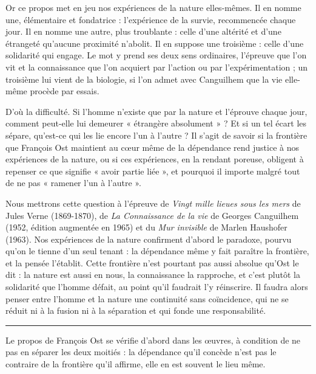 \documentclass[11pt,a4paper]{article}
\begin{document}
Or ce propos met en jeu nos expériences de la nature elles-mêmes. Il en nomme une, élémentaire et fondatrice : l'expérience de la survie, recommencée chaque jour. Il en nomme une autre, plus troublante : celle d'une altérité et d'une étrangeté qu'aucune proximité n'abolit. Il en suppose une troisième : celle d'une solidarité qui engage. Le mot y prend ses deux sens ordinaires, l'épreuve que l'on vit et la connaissance que l'on acquiert par l'action ou par l'expérimentation ; un troisième lui vient de la biologie, si l'on admet avec Canguilhem que la vie elle-même procède par essais.

D'où la difficulté. Si l'homme n'existe que par la nature et l'éprouve chaque jour, comment peut-elle lui demeurer « étrangère absolument » ? Et si un tel écart les sépare, qu'est-ce qui les lie encore l'un à l'autre ? Il s'agit de savoir si la frontière que François Ost maintient au cœur même de la dépendance rend justice à nos expériences de la nature, ou si ces expériences, en la rendant poreuse, obligent à repenser ce que signifie « avoir partie liée », et pourquoi il importe malgré tout de ne pas « ramener l'un à l'autre ».

Nous mettrons cette question à l'épreuve de \emph{Vingt mille lieues sous les mers} de Jules Verne (1869-1870), de \emph{La Connaissance de la vie} de Georges Canguilhem (1952, édition augmentée en 1965) et du \emph{Mur invisible} de Marlen Haushofer (1963). Nos expériences de la nature confirment d'abord le paradoxe, pourvu qu'on le tienne d'un seul tenant : la dépendance même y fait paraître la frontière, et la pensée l'établit. Cette frontière n'est pourtant pas aussi absolue qu'Ost le dit : la nature est aussi en nous, la connaissance la rapproche, et c'est plutôt la solidarité que l'homme défait, au point qu'il faudrait l'y réinscrire. Il faudra alors penser entre l'homme et la nature une continuité sans coïncidence, qui ne se réduit ni à la fusion ni à la séparation et qui fonde une responsabilité.

\begin{center}\rule{0.5\linewidth}{0.5pt}\end{center}

Le propos de François Ost se vérifie d'abord dans les œuvres, à condition de ne pas en séparer les deux moitiés : la dépendance qu'il concède n'est pas le contraire de la frontière qu'il affirme, elle en est souvent le lieu même.
\end{document}
